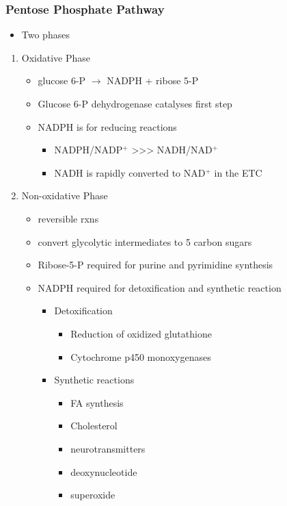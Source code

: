 \documentclass{scrartcl}
\begin{document}
\subsubsection{Pentose Phosphate Pathway}
\label{sec:orgaecaf77}
\begin{itemize}
\item Two phases
\end{itemize}
\begin{enumerate}
\item Oxidative Phase
\label{sec:org6c7bd30}
\begin{itemize}
\item glucose 6-P \(\to\) NADPH + ribose 5-P
\item Glucose 6-P dehydrogenase catalyses first step
\item NADPH is for reducing reactions
\begin{itemize}
\item NADPH/NADP\(^{\text{+}}\) \textgreater{}\textgreater{}\textgreater{} NADH/NAD\(^{\text{+}}\)
\item NADH is rapidly converted to NAD\(^{\text{+}}\) in the ETC
\end{itemize}
\end{itemize}
\item Non-oxidative Phase
\label{sec:org84df7f4}
\begin{itemize}
\item reversible rxns
\item convert glycolytic intermediates to 5 carbon sugars

\item Ribose-5-P required for purine and pyrimidine synthesis
\item NADPH required for detoxification and synthetic reaction
\begin{itemize}
\item Detoxification
\begin{itemize}
\item Reduction of oxidized glutathione
\item Cytochrome p450 monoxygenases
\end{itemize}
\item Synthetic reactions
\begin{itemize}
\item FA synthesis
\item Cholesterol
\item neurotransmitters
\item deoxynucleotide
\item superoxide
\end{itemize}
\end{itemize}
\end{itemize}
\end{enumerate}
\end{document}
